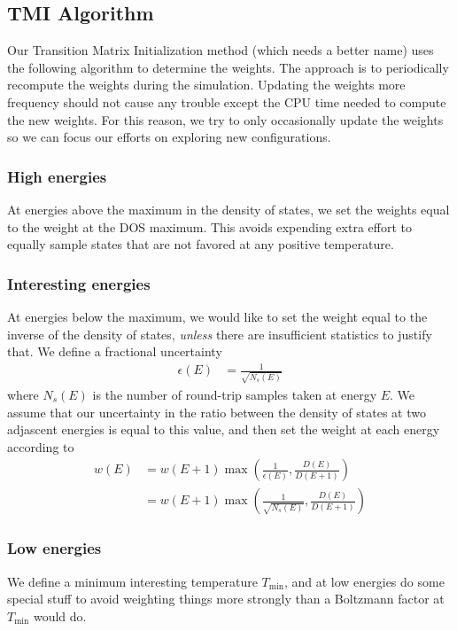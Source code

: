 \documentclass[letterpaper,twocolumn,amsmath,amssymb,pre,aps,10pt]{revtex4-1}
\begin{document}
\subsection{TMI Algorithm}

Our Transition Matrix Initialization method (which needs a better
name) uses the following algorithm to determine the weights.  The
approach is to periodically recompute the weights during the
simulation.  Updating the weights more frequency should not cause any
trouble except the CPU time needed to compute the new weights.  For
this reason, we try to only occasionally update the weights so we can
focus our efforts on exploring new configurations.

\subsubsection{High energies}
At energies above the maximum in the density of states, we set
the weights equal to the weight at the DOS maximum.  This avoids
expending extra effort to equally sample states that are not favored
at any positive temperature.

\subsubsection{Interesting energies}
At energies below the maximum, we would like to set the weight equal
to the inverse of the density of states, \emph{unless} there are
insufficient statistics to justify that.  We define a fractional
uncertainty
\begin{align}
  \epsilon(E) &= \frac{1}{\sqrt{N_s(E)}}
\end{align}
where $N_s(E)$ is the number of round-trip samples taken at energy
$E$.  We assume that our uncertainty in the ratio between the density
of states at two adjascent energies is equal to this value, and then
set the weight at each energy according to
\begin{align}
  w(E) &= w(E+1)\max\left(\frac1{\epsilon(E)},
  \frac{D(E)}{D(E+1)}\right)
  \\
   &= w(E+1)\max\left(\frac1{\sqrt{N_s(E)}},
  \frac{D(E)}{D(E+1)}\right)
\end{align}

\subsubsection{Low energies}
We define a minimum interesting temperature $T_{\min}$, and at low
energies do some special stuff to avoid weighting things more
strongly than a Boltzmann factor at $T_{\min}$ would do.
\end{document}
